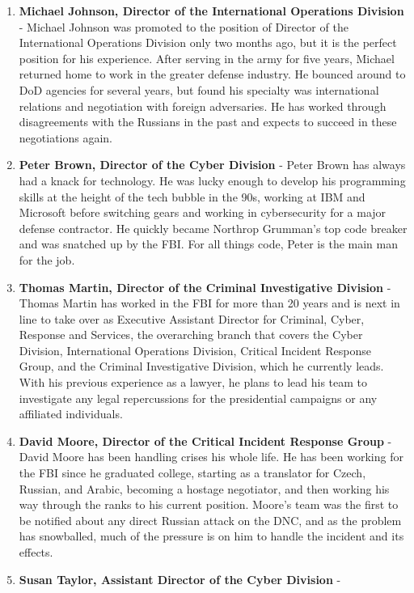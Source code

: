 \documentclass[10pt, letterpaper]{article}
\begin{document}
\begin{enumerate}
\item
  \textbf{Michael Johnson, Director of the International Operations
  Division} - Michael Johnson was promoted to the position of Director
  of the International Operations Division only two months ago, but it
  is the perfect position for his experience. After serving in the army
  for five years, Michael returned home to work in the greater defense
  industry. He bounced around to DoD agencies for several years, but
  found his specialty was international relations and negotiation with
  foreign adversaries. He has worked through disagreements with the
  Russians in the past and expects to succeed in these negotiations
  again.
\item
  \textbf{Peter Brown, Director of the Cyber Division} - Peter Brown has
  always had a knack for technology. He was lucky enough to develop his
  programming skills at the height of the tech bubble in the 90s,
  working at IBM and Microsoft before switching gears and working in
  cybersecurity for a major defense contractor. He quickly became
  Northrop Grumman's top code breaker and was snatched up by the FBI.
  For all things code, Peter is the main man for the job.
\item
  \textbf{Thomas Martin, Director of the Criminal Investigative
  Division} - Thomas Martin has worked in the FBI for more than 20 years
  and is next in line to take over as Executive Assistant Director for
  Criminal, Cyber, Response and Services, the overarching branch that
  covers the Cyber Division, International Operations Division, Critical
  Incident Response Group, and the Criminal Investigative Division,
  which he currently leads. With his previous experience as a lawyer, he
  plans to lead his team to investigate any legal repercussions for the
  presidential campaigns or any affiliated individuals.
\item
  \textbf{David Moore, Director of the Critical Incident Response Group}
  - David Moore has been handling crises his whole life. He has been
  working for the FBI since he graduated college, starting as a
  translator for Czech, Russian, and Arabic, becoming a hostage
  negotiator, and then working his way through the ranks to his current
  position. Moore's team was the first to be notified about any direct
  Russian attack on the DNC, and as the problem has snowballed, much of
  the pressure is on him to handle the incident and its effects.
\item
  \textbf{Susan Taylor, Assistant Director of the Cyber Division} -

\end{enumerate}
\end{document}
